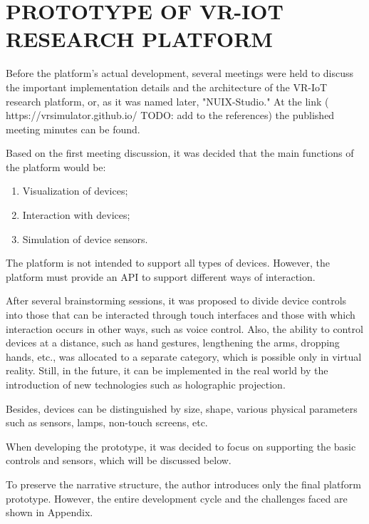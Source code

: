
\chapter{PROTOTYPE OF VR-IOT RESEARCH PLATFORM}

Before the platform's actual development, several meetings were held to discuss the important implementation details and the architecture of the VR-IoT research platform, or, as it was named later, "NUIX-Studio." At the link ( https://vrsimulator.github.io/ TODO: add to the references)  the published meeting minutes can be found. 

Based on the first meeting discussion, it was decided that the main functions of the platform would be:
\begin{enumerate}
     \item Visualization of devices;
     \item Interaction with devices;
     \item Simulation of device sensors.
\end{enumerate}

The platform is not intended to support all types of devices. However, the platform must provide an API to support different ways of interaction.

After several brainstorming sessions, it was proposed to divide device controls into those that can be interacted through touch interfaces and those with which interaction occurs in other ways, such as voice control. Also, the ability to control devices at a distance, such as hand gestures, lengthening the arms, dropping hands, etc., was allocated to a separate category, which is possible only in virtual reality. Still, in the future, it can be implemented in the real world by the introduction of new technologies such as holographic projection.

Besides, devices can be distinguished by size, shape, various physical parameters such as sensors, lamps, non-touch screens, etc.

When developing the prototype, it was decided to focus on supporting the basic controls and sensors, which will be discussed below.

To preserve the narrative structure, the author introduces only the final platform prototype. However, the entire development cycle and the challenges faced are shown in Appendix.

